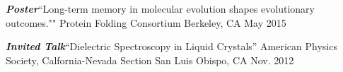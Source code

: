 \begin{cvpresentations}
  \cvpresentation
    {\textbf{\textit{Poster}}{\enskip\cdotp\enskip}``Long-term memory in molecular evolution shapes evolutionary outcomes.""} %
    {Protein Folding Consortium} %
    {Berkeley, CA} %
    {May 2015} %

  \cvpresentation
    {\textbf{\textit{Invited Talk}}{\enskip\cdotp\enskip}``Dielectric Spectroscopy in Liquid Crystals''} %
    {American Physics Society, Calfornia-Nevada Section} %
    {San Luis Obispo, CA} %
    {Nov. 2012} %

\end{cvpresentations}
